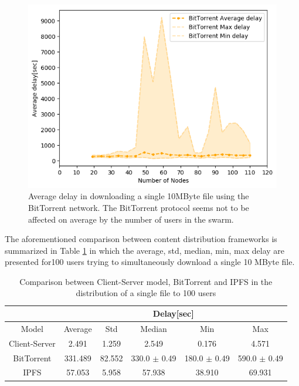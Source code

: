 {{{\begin{figure}[!htb]
\centering
\includegraphics[width=\textwidth]{./results/BitTorrent.png}
\caption{Average delay in downloading a single 10MByte file using the BitTorrent network. The BitTorrent protocol seems not to be affected on average by the number of users in the swarm.}
\label{fig:BitTorrentPerf}
\end{figure}

The aforementioned comparison between content distribution frameworks is summarized in Table \ref{tab:all_comp} in which the average, std, median, min, max delay are presented for100 users trying to simultaneously download a single 10 MByte file.

\begin {table}[htb!]
\caption {Comparison between Client-Server model, BitTorrent and IPFS in the distribution of a single file to 100 users} \label{tab:all_comp} 
\begin{center}
 \begin{tabular}{|c| c|c |c | c| c |}
 \hline
  & \multicolumn{5}{|c|}{Delay[sec]} \\
 \hline
 Model & Average& Std & Median & Min & Max \\ [0.5ex] 
 \hline
  Client-Server & 2.491 & 1.259 & 2.549 & 0.176 & 4.571 \\
  \hline
  BitTorrent & 331.489 & 82.552 & 330.0 $\pm$ 0.49 & 180.0 $\pm$ 0.49 & 590.0 $\pm$ 0.49 \\
  \hline
  IPFS & 57.053 & 5.958 & 57.938 & 38.910 & 69.931 \\
  \hline
\end{tabular}
\end{center}
\end {table}

}
}
}